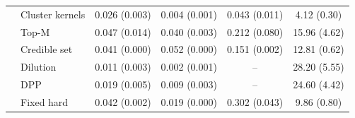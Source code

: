 \begin{tabular}{llcccc}
 & Cluster kernels & 0.026 (0.003) & 0.004 (0.001) & 0.043 (0.011) & 4.12 (0.30) \\
 & Top-M & 0.047 (0.014) & 0.040 (0.003) & 0.212 (0.080) & 15.96 (4.62) \\
 & Credible set & 0.041 (0.000) & 0.052 (0.000) & 0.151 (0.002) & 12.81 (0.62) \\
 & Dilution & 0.011 (0.003) & 0.002 (0.001) & -- & 28.20 (5.55) \\
 & DPP & 0.019 (0.005) & 0.009 (0.003) & -- & 24.60 (4.42) \\
 & Fixed hard & 0.042 (0.002) & 0.019 (0.000) & 0.302 (0.043) & 9.86 (0.80) \\
\bottomrule
\end{tabular}
